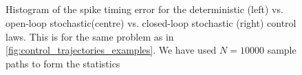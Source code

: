 \documentclass[12pt]{iopart}
\begin{document}
\begin{figure}[h]
\begin{center}
\\
  \\
\\
\\
  \caption[labelInTOC]{Histogram of the spike timing error for the
  deterministic (left) vs. open-loop stochastic(centre) vs. closed-loop
  stochastic (right) control laws. This is for the same problem as in
  \cref{fig:control_trajectories_examples}.
  We have used $N=10000$ sample paths
  to form the statistics}
  \label{fig:error_histograms_det_vs_openloop_vs_stoch}
\end{center}
\end{figure}
\end{document}
